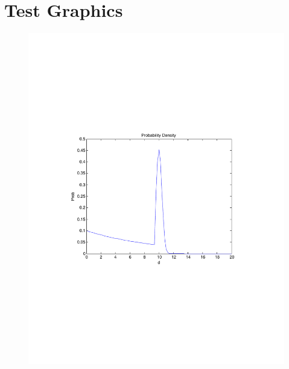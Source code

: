 \documentclass[10pt]{article}
\begin{document}
\section{Test Graphics}

\begin{figure}[h]
	\centering
	\includegraphics[width=0.4\linewidth]{ProbFunction}
\end{figure}
\end{document}
